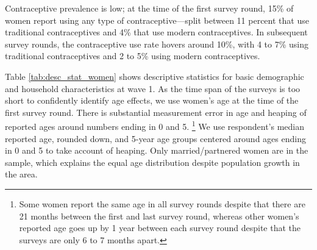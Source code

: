 \documentclass[letterpaper,12pt]{article}
\begin{document}
Contraceptive prevalence is low; at the time of the first survey round, 15\% 
of women report using any type of contraceptive---split between 11 percent that use 
traditional contraceptives and 4\% that use modern contraceptives.
In subsequent survey rounds, the contraceptive use rate hovers around 10\%, 
with 4 to 7\% using traditional contraceptives and 2 to 5\% 
using modern contraceptives.





Table \ref{tab:desc_stat_women} shows descriptive statistics for basic
demographic and household characteristics at wave 1.
As the time span of the surveys is too short to confidently identify age effects,
we use women's age at the time of the first survey round.
There is substantial measurement error in age and heaping of reported ages 
around numbers ending in 0 and 5.%
\footnote{
Some women report the same age in all survey rounds despite that there are
21 months between the first and last survey round, whereas other women's reported 
age goes up by 1 year between each survey round despite that the surveys are only 
6 to 7 months apart.
}
We use respondent's median reported age, rounded down, and 5-year age groups 
centered around ages ending in 0 and 5 to take account of heaping.
Only married/partnered women are in the sample, which explains the 
equal age distribution despite population growth in the area.
\end{document}
